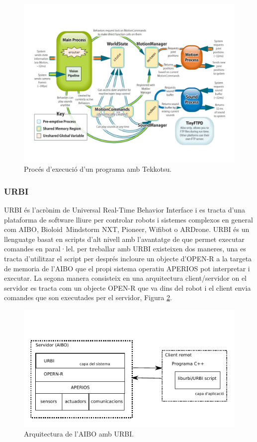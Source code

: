 \documentclass[12pt,a4paper,final,twoside]{article}
\begin{document}
\begin{figure}[h!]
	\centering
    \includegraphics[scale=0.3]{images/tekkotsuarch.pdf}
	 \caption{Procés d'execució d'un programa amb Tekkotsu.}
  \label{fig:tekkarch}
\end{figure}

\subsubsection{URBI}
\label{urbi}
URBI és l'acrònim de Universal Real-Time Behavior Interface i es tracta d'una plataforma de software lliure per controlar robots i sistemes complexos en general com AIBO, Bioloid\, Mindstorm NXT, Pioneer, Wifibot o ARDrone\cite{urbi}. URBI és un llenguatge basat en scripts d'alt nivell amb l'avantatge de que permet executar comandes en paral·lel. per treballar amb URBI existeixen dos maneres, una es tracta d'utilitzar el script per després incloure un objecte d'OPEN-R a la targeta de memoria de l'AIBO que el propi sistema operatiu APERIOS pot interpretar i executar. La segona manera consisteix en una arquitectura client/servidor on el servidor es tracta com un objecte OPEN-R que va dins del robot i el client envia comandes que son executades per el servidor, Figura \ref{fig:urbiarc}. 

\begin{figure}[h!]
	\centering
    \includegraphics[scale=1.4]{images/urbiarc.pdf}
	 \caption{Arquitectura de l'AIBO amb URBI.}
  \label{fig:urbiarc}
\end{figure}
\end{document}
